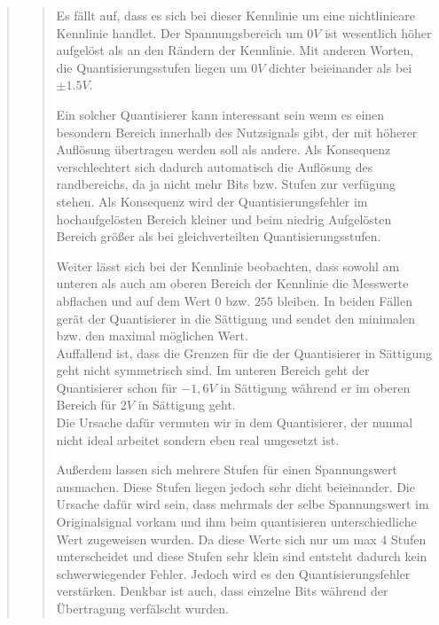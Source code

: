 \begin{quote}
\begin{quote}
        Es fällt auf, dass es sich bei dieser Kennlinie um eine nichtlinieare Kennlinie handlet. Der Spannungsbereich um
        $0V$ ist wesentlich höher aufgelöst als an den Rändern der Kennlinie. Mit anderen Worten, die
        Quantisierungsstufen liegen um $0V$ dichter beieinander als bei $\pm 1.5V$.\vspace{1em}
        
        Ein solcher Quantisierer kann interessant sein wenn es einen besondern Bereich innerhalb des Nutzsignals gibt,
        der mit höherer Auflösung übertragen werden soll als andere. Als Konsequenz verschlechtert sich dadurch
        automatisch die Auflösung des randbereichs, da ja nicht mehr Bits bzw. Stufen zur verfügung
        stehen. Als Konsequenz wird der Quantisierungsfehler im hochaufgelösten Bereich kleiner und beim
        niedrig Aufgelösten Bereich größer als bei gleichverteilten Quantisierungsstufen.\vspace{1em}
        
        Weiter lässt sich bei der Kennlinie beobachten, dass sowohl am unteren als auch am oberen Bereich der
        Kennlinie die Messwerte abflachen und auf dem Wert $0$ bzw. $255$ bleiben. In beiden Fällen gerät der
        Quantisierer in die Sättigung und sendet den minimalen bzw. den maximal möglichen Wert.\\
        Auffallend ist, dass die Grenzen für die der Quantisierer in Sättigung geht nicht symmetrisch sind. Im unteren
        Bereich geht der Quantisierer schon für $-1,6 V$ in Sättigung während er im oberen Bereich für $2 V$ in
        Sättigung geht.\\
        Die Ursache dafür vermuten wir in dem Quantisierer, der nunmal nicht ideal arbeitet sondern eben real umgesetzt
        ist.\vspace{1em}
        
        Außerdem lassen sich mehrere Stufen für einen Spannungswert ausmachen. Diese Stufen liegen jedoch sehr dicht
        beieinander. Die Ursache dafür wird sein, dass mehrmals der selbe Spannungswert im Originalsignal vorkam und
        ihm beim quantisieren unterschiedliche Wert zugeweisen wurden. Da diese Werte sich nur um max $4$ Stufen
        unterscheidet und diese Stufen sehr klein sind entsteht dadurch kein schwerwiegender Fehler. Jedoch wird es den
        Quantisierungsfehler verstärken. Denkbar ist auch, dass einzelne Bits während der Übertragung verfälscht
        wurden.\vspace{1em}
        

\end{quote}
\end{quote}
